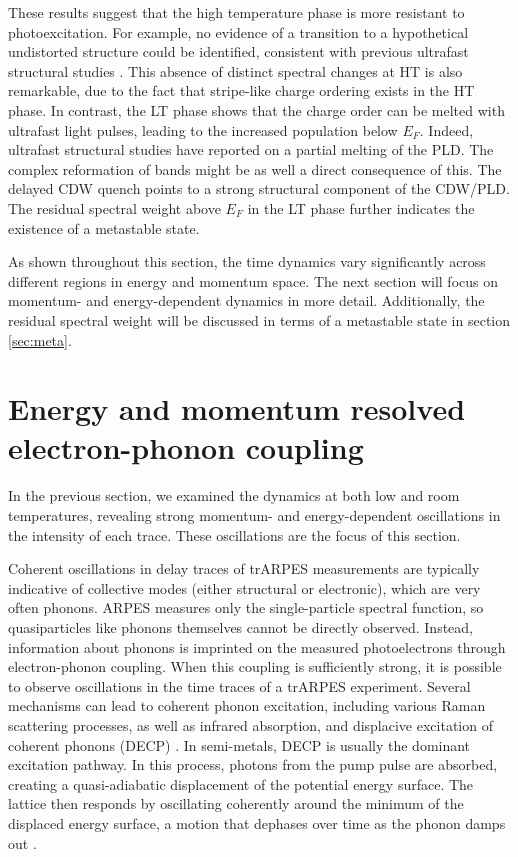 These results suggest that the high temperature phase is more resistant to photoexcitation.
For example, no evidence of a transition to a hypothetical undistorted structure could be identified, consistent with previous ultrafast structural studies \cite{domrose_femtosecond_2024}.
This absence of distinct spectral changes at HT is also remarkable, due to the fact that stripe-like charge ordering exists in the HT phase.
In contrast, the LT phase shows that the charge order can be melted with ultrafast light pulses, leading to the increased population below $E_F$.
Indeed, ultrafast structural studies \cite{domrose_femtosecond_2024, siddiqui_ultrafast_2021} have reported on a partial melting of the PLD.
The complex reformation of bands might be as well a direct consequence of this.
The delayed CDW quench points to a strong structural component of the CDW/PLD.
The residual spectral weight above $E_F$ in the LT phase further indicates the existence of a metastable state.

As shown throughout this section, the time dynamics vary significantly across different regions in energy and momentum space.
The next section will focus on momentum- and energy-dependent dynamics in more detail.
Additionally, the residual spectral weight will be discussed in terms of a metastable state in section \ref{sec:meta}.

\section{Energy and momentum resolved electron-phonon coupling}
\label{sec:phonon_osc}

In the previous section, we examined the dynamics at both low and room temperatures, revealing strong momentum- and energy-dependent oscillations in the intensity of each trace.
These oscillations are the focus of this section.

Coherent oscillations in delay traces of trARPES measurements are typically indicative of collective modes (either structural or electronic), which are very often phonons.
ARPES measures only the single-particle spectral function, so quasiparticles like phonons themselves cannot be directly observed.
Instead, information about phonons is imprinted on the measured photoelectrons through electron-phonon coupling.
When this coupling is sufficiently strong, it is possible to observe oscillations in the time traces of a trARPES experiment.
Several mechanisms can lead to coherent phonon excitation, including various Raman scattering processes, as well as infrared absorption, and displacive excitation of coherent phonons (DECP) \cite{zeiger_theory_1992, kuznetsov_theory_1994, giret_entropy_2011, juraschek_sum-frequency_2018, lakehal_microscopic_2019, caruso_quantum_2023, emeis_coherent_2024}.
In semi-metals, DECP is usually the dominant excitation pathway.
In this process, photons from the pump pulse are absorbed, creating a quasi-adiabatic displacement of the potential energy surface.
The lattice then responds by oscillating coherently around the minimum of the displaced energy surface, a motion that dephases over time as the phonon damps out \cite{zeiger_theory_1992, kuznetsov_theory_1994, bothschafter_ultrafast_2013, emeis_coherent_2024}.

